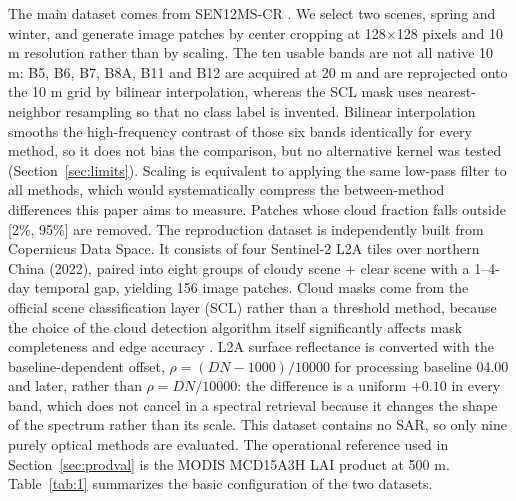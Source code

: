 \documentclass[a4paper,fleqn]{cas-dc}
\begin{document}
The main dataset comes from SEN12MS-CR \cite{ref1}. We select two scenes, spring and winter, and generate image patches by center cropping at 128$\times$128 pixels and 10 m resolution rather than by scaling. The ten usable bands are not all native 10 m: B5, B6, B7, B8A, B11 and B12 are acquired at 20 m and are reprojected onto the 10 m grid by bilinear interpolation, whereas the SCL mask uses nearest-neighbor resampling so that no class label is invented. Bilinear interpolation smooths the high-frequency contrast of those six bands identically for every method, so it does not bias the comparison, but no alternative kernel was tested (Section~\ref{sec:limits}). Scaling is equivalent to applying the same low-pass filter to all methods, which would systematically compress the between-method differences this paper aims to measure. Patches whose cloud fraction falls outside [2\%, 95\%] are removed. The reproduction dataset is independently built from Copernicus Data Space. It consists of four Sentinel-2 L2A tiles over northern China (2022), paired into eight groups of cloudy scene + clear scene with a 1--4-day temporal gap, yielding 156 image patches. Cloud masks come from the official scene classification layer (SCL) rather than a threshold method, because the choice of the cloud detection algorithm itself significantly affects mask completeness and edge accuracy \cite{ref25}. L2A surface reflectance is converted with the baseline-dependent offset, $\rho=(DN-1000)/10000$ for processing baseline 04.00 and later, rather than $\rho=DN/10000$: the difference is a uniform $+0.10$ in every band, which does not cancel in a spectral retrieval because it changes the shape of the spectrum rather than its scale. This dataset contains no SAR, so only nine purely optical methods are evaluated. The operational reference used in Section~\ref{sec:prodval} is the MODIS MCD15A3H LAI product at 500 m. Table~\ref{tab:1} summarizes the basic configuration of the two datasets.
\end{document}
